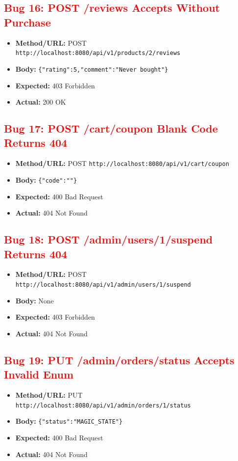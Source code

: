 \documentclass{article}
\begin{document}
\subsection*{\textcolor{red}{Bug 16: POST /reviews Accepts Without Purchase}}
\begin{itemize}[noitemsep]
  \item \textbf{Method/URL:} POST \texttt{http://localhost:8080/api/v1/products/2/reviews}
  \item \textbf{Body:} \texttt{\{"rating":5,"comment":"Never bought"\}}
  \item \textbf{Expected:} 403 Forbidden
  \item \textbf{Actual:} 200 OK
\end{itemize}

\subsection*{\textcolor{red}{Bug 17: POST /cart/coupon Blank Code Returns 404}}
\begin{itemize}[noitemsep]
  \item \textbf{Method/URL:} POST \texttt{http://localhost:8080/api/v1/cart/coupon}
  \item \textbf{Body:} \texttt{\{"code":""\}}
  \item \textbf{Expected:} 400 Bad Request
  \item \textbf{Actual:} 404 Not Found
\end{itemize}

\subsection*{\textcolor{red}{Bug 18: POST /admin/users/1/suspend Returns 404}}
\begin{itemize}[noitemsep]
  \item \textbf{Method/URL:} POST \texttt{http://localhost:8080/api/v1/admin/users/1/suspend}
  \item \textbf{Body:} None
  \item \textbf{Expected:} 403 Forbidden
  \item \textbf{Actual:} 404 Not Found
\end{itemize}

\subsection*{\textcolor{red}{Bug 19: PUT /admin/orders/status Accepts Invalid Enum}}
\begin{itemize}[noitemsep]
  \item \textbf{Method/URL:} PUT \texttt{http://localhost:8080/api/v1/admin/orders/1/status}
  \item \textbf{Body:} \texttt{\{"status":"MAGIC\_STATE"\}}
  \item \textbf{Expected:} 400 Bad Request
  \item \textbf{Actual:} 404 Not Found
\end{itemize}
\end{document}
